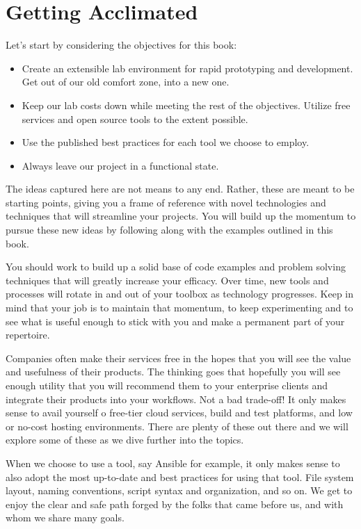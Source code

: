 \chapter{Getting Acclimated}

\justify
Let's start by considering the objectives for this book:
\justify
\begin{itemize}
\item
  Create an extensible lab environment for rapid prototyping and
  development. Get out of our old comfort zone, into a new one.
\item
  Keep our lab costs down while meeting the rest of the objectives.
  Utilize free services and open source tools to the extent possible.
\item
  Use the published best practices for each tool we choose to employ.
\item
  Always leave our project in a functional state.
\end{itemize}

\justify
The ideas captured here are not means to any end. Rather, these are meant to be starting points, giving you a frame of reference with novel technologies and techniques that will streamline your projects. You will build up the momentum to pursue these new ideas by following along with the examples outlined in this book.

\justify
You should work to build up a solid base of code examples and problem solving techniques that will greatly increase your efficacy. Over time, new tools and processes will rotate in and out of your toolbox as technology progresses. Keep in mind that your job is to maintain that momentum, to keep experimenting and to see what is useful enough to stick with you and make a permanent part of your repertoire.

\justify
Companies often make their services free in the hopes that you will see the value and usefulness of their products. The thinking goes that hopefully you will see enough utility that you will recommend them to your enterprise clients and integrate their products into your workflows. Not a bad trade-off! It only makes sense to avail yourself o free-tier cloud services, build and test platforms, and low or no-cost hosting environments. There are plenty of these out there and we will explore some of these as we dive further into the topics.

\justify
When we choose to use a tool, say Ansible for example, it only makes sense to also adopt the most up-to-date and best practices for using that tool. File system layout, naming conventions, script syntax and organization, and so on. We get to enjoy the clear and safe path forged by the folks that came before us, and with whom we share many goals.

